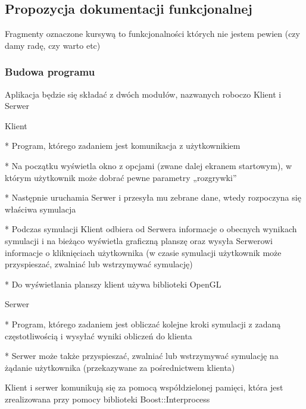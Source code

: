 \subsection*{Propozycja dokumentacji funkcjonalnej}

Fragmenty oznaczone kursywą to funkcjonalności których nie jestem pewien (czy damy radę, czy warto etc)

\subsubsection*{Budowa programu}

Aplikacja będzie się składać z dwóch modułów, nazwanych roboczo Klient i Serwer


\begin{DoxyItemize}
\item Klient \begin{DoxyVerb}  * Program, którego zadaniem jest komunikacja z użytkownikiem 

  * Na początku wyświetla okno z opcjami (zwane dalej ekranem startowym), w którym użytkownik może dobrać pewne parametry „rozgrywki” 

  * Następnie uruchamia Serwer i przesyła mu zebrane dane, wtedy rozpoczyna się właściwa symulacja 

  * Podczas symulacji Klient odbiera od Serwera informacje o obecnych wynikach symulacji i na bieżąco wyświetla graficzną planszę oraz wysyła Serwerowi informacje o kliknięciach użytkownika (w czasie symulacji użytkownik może przyspieszać, zwalniać lub wstrzymywać symulację) 

  * Do wyświetlania planszy klient używa biblioteki OpenGL 
\end{DoxyVerb}

\end{DoxyItemize}


\begin{DoxyItemize}
\item Serwer \begin{DoxyVerb}  * Program, którego zadaniem jest obliczać kolejne kroki symulacji z zadaną częstotliwością i wysyłać wyniki obliczeń do klienta

  * Serwer może także przyspieszać, zwalniać lub wstrzymywać symulację na żądanie użytkownika (przekazywane za pośrednictwem klienta)
\end{DoxyVerb}

\end{DoxyItemize}

Klient i serwer komunikują się za pomocą współdzielonej pamięci, która jest zrealizowana przy pomocy biblioteki Boost\-::\-Interprocess

